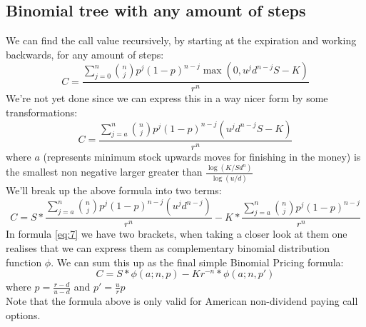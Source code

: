 \documentclass{article}
\DeclareMathOperator{\max}{max}
\begin{document}
\subsection{Binomial tree with any amount of steps}
We can find the call value recursively, by starting at the expiration and working backwards, for any amount of steps:
\begin{equation}\label{eq:5}
    C = \frac{\sum_{j=0}^{n} {n \choose j} p^{j}(1-p)^{n-j}\max(0, u^{j}d^{n-j}S - K)}{r^{n}}
\end{equation}
We’re not yet done since we can express this in a way nicer form by some transformations:
\begin{equation}\label{eq:6}
    C = \frac{\sum_{j=a}^{n} {n \choose j} p^{j}(1-p)^{n-j} (u^{j}d^{n-j}S - K)}{r^{n}}
\end{equation}
where $a$ (represents minimum stock upwards moves for finishing in the money) is the smallest non negative larger greater than $\frac{\log(K / S d^{n})}{\log(u / d)} $ \\
We'll break up the above formula into two terms:
\begin{equation}\label{eq:7}
    C = S *\frac{\sum_{j=a}^{n} {n \choose j} p^{j}(1-p)^{n-j} (u^{j}d^{n-j})}{r^{n}} - K * \frac{\sum_{j=a}^{n} {n \choose j} p^{j}(1-p)^{n-j}}{r^{n}}
\end{equation}
In formula \ref{eq:7} we have two brackets, when taking a closer look at them one realises that we can express them as complementary binomial distribution function $\phi$. We can sum this up as the final simple Binomial Pricing formula:
\begin{equation}\label{eq:8}
    C = S *\phi(a; n, p) - K r^{-n} * \phi(a; n, p')
\end{equation}
where $p=\frac{r-d}{u-d}$ and $p'=\frac{u}{r}p$\\ [2ex]
Note that the formula above is only valid for American non-dividend paying call options.
\end{document}
